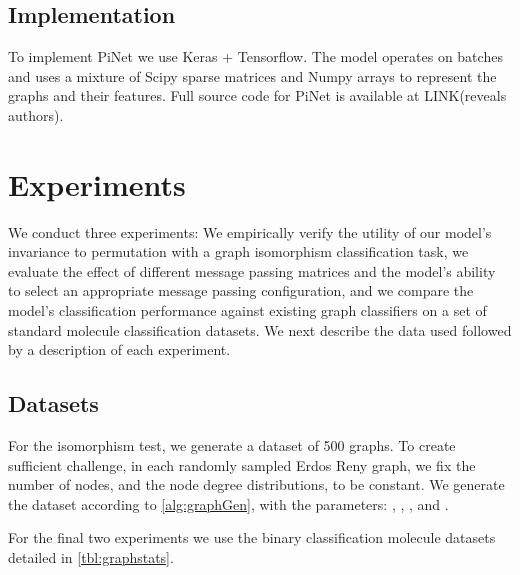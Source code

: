 \documentclass{article}
\theoremstyle{definition}
\begin{document}
\subsection{Implementation}

To implement PiNet we use Keras + Tensorflow. The model operates on batches and uses a mixture of Scipy sparse matrices and Numpy arrays to represent the graphs and their features. Full source code for PiNet is available at LINK(reveals authors).

\section{Experiments}

We conduct three experiments: We empirically verify the utility of our model's invariance to permutation with a graph isomorphism classification task, we evaluate the effect of different message passing matrices and the model's ability to select an appropriate message passing configuration, and we compare the model's classification performance against existing graph classifiers on a set of standard molecule classification datasets. We next describe the data used followed by a description of each experiment.

\subsection{Datasets}

For the isomorphism test, we generate a dataset of 500 graphs. To create sufficient challenge, in each randomly sampled Erdos Reny \cite{ErdOs1960} graph, we fix the number of nodes, and the node degree distributions, to be constant. We generate the dataset according to \autoref{alg:graphGen}, with the parameters: , , , and .

For the final two experiments we use the binary classification molecule datasets detailed in \autoref{tbl:graphstats}.
\end{document}
